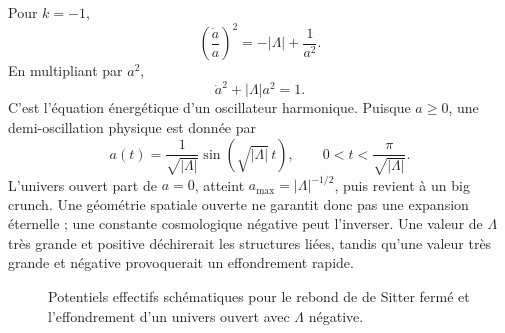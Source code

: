 Pour \(k=-1\),
\begin{equation}
\left(\frac{\dot a}{a}\right)^2=-|\Lambda|+\frac{1}{a^2}.
\end{equation}
En multipliant par \(a^2\),
\begin{equation}
\dot a^2+|\Lambda|a^2=1.
\label{eq:c05-negative-lambda-oscillator}
\end{equation}
C’est l’équation énergétique d’un oscillateur harmonique. Puisque \(a\geq0\), une demi-oscillation physique est donnée par
\begin{equation}
a(t)=\frac{1}{\sqrt{|\Lambda|}}
\sin\!\left(\sqrt{|\Lambda|}\,t\right),
\qquad
0<t<\frac{\pi}{\sqrt{|\Lambda|}}.
\end{equation}
L’univers ouvert part de \(a=0\), atteint \(a_{\max}=|\Lambda|^{-1/2}\), puis revient à un big crunch. Une géométrie spatiale ouverte ne garantit donc pas une expansion éternelle ; une constante cosmologique négative peut l’inverser. Une valeur de \(\Lambda\) très grande et positive déchirerait les structures liées, tandis qu’une valeur très grande et négative provoquerait un effondrement rapide.

\begin{figure}[htbp]
\centering
{}
\hspace{2em}
\caption{Potentiels effectifs schématiques pour le rebond de de Sitter fermé et l’effondrement d’un univers ouvert avec \(\Lambda\) négative.}
\label{fig:c05-mechanical-potentials}
\end{figure}

\begin{classroomqa}
\end{classroomqa}

